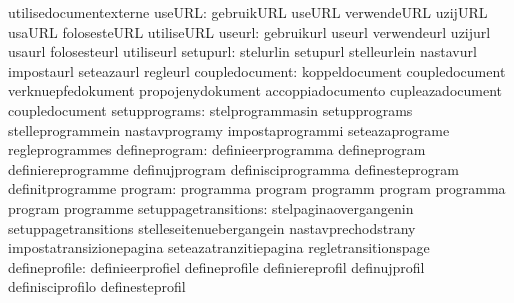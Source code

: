                                   utilisedocumentexterne
                          useURL: gebruikURL                       useURL
                                  verwendeURL                      uzijURL
                                  usaURL                           folosesteURL
                                  utiliseURL
                          useurl: gebruikurl                       useurl
                                  verwendeurl                      uzijurl
                                  usaurl                           folosesteurl
                                  utiliseurl
                        setupurl: stelurlin                        setupurl
                                  stelleurlein                     nastavurl
                                  impostaurl                       seteazaurl
                                  regleurl
                  coupledocument: koppeldocument                   coupledocument
                                  verknuepfedokument               propojenydokument
                                  accoppiadocumento                cupleazadocument
                                  coupledocument
                   setupprograms: stelprogrammasin                 setupprograms
                                  stelleprogrammein                nastavprogramy
                                  impostaprogrammi                 seteazaprograme
                                  regleprogrammes
                   defineprogram: definieerprogramma               defineprogram
                                  definiereprogramme               definujprogram
                                  definisciprogramma               definesteprogram
                                  definitprogramme
                         program: programma                        program
                                  programm                         program
                                  programma                        program
                                  programme
            setuppagetransitions: stelpaginaovergangenin           setuppagetransitions
                                  stelleseitenuebergangein         nastavprechodstrany
                                  impostatransizionepagina         seteazatranzitiepagina
                                  regletransitionspage
                   defineprofile: definieerprofiel                 defineprofile
                                  definiereprofil                  definujprofil
                                  definisciprofilo                 definesteprofil

